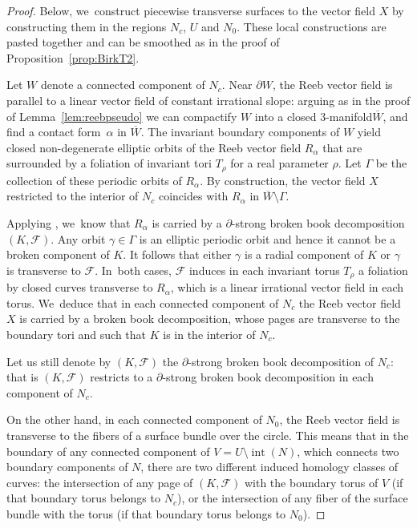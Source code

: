 \documentclass[11pt]{article}
\newcommand{\threemanifold}{$3$\nobreakdash-mani\-fold\xspace}
\theoremstyle{definition}
\begin{document}
\begin{proof}
Below, we~construct piecewise transverse surfaces to the vector field $X$ by constructing them in the regions $N_c$, $U$ and $N_0$. These local constructions are pasted together and can be smoothed as in the proof of Proposition~\ref{prop:BirkT2}.

Let $W$ denote a connected component of $N_c$. Near $\partial W$, the Reeb vector field is parallel to a linear vector field of constant irrational slope: arguing as in the proof of Lemma~\ref{lem:reebpseudo} we can compactify $W$ into a closed \threemanifold $\overline W$, and find a contact form~$\alpha$ in $\overline W$. The invariant boundary components of $W$ yield closed non-degenerate elliptic orbits of the Reeb vector field $R_\alpha$ that are surrounded by a foliation of invariant tori $T_\rho$ for a real parameter $\rho$. Let $\Gamma$ be the collection of these periodic orbits of $R_\alpha$.
By construction, the vector field $X$ restricted to the interior of $N_c$ coincides with $R_\alpha$ in $\overline W \setminus \Gamma$.

Applying \cite[Th.\,1.1]{CDR}, we~know that $R_\alpha$ is carried by a $\partial$-strong broken book decomposition $(K,\mathcal{F})$. Any orbit $\gamma \in \Gamma$ is an elliptic periodic orbit and hence it cannot be a broken component of $K$. It follows that either $\gamma$ is a radial component of $K$ or $\gamma$ is transverse to $\mathcal{F}$. In~both cases, $\mathcal{F}$ induces in each invariant torus $T_\rho$ a foliation by closed curves transverse to $R_\alpha$, which is a linear irrational vector field in each torus. We~deduce that in each connected component of $N_c$ the Reeb vector field $X$ is carried by a broken book decomposition, whose pages are transverse to the boundary tori and such that $K$ is in the interior of $N_c$.

Let us still denote by $(K,\mathcal{F})$ the $\partial$-strong broken book decomposition of $N_c$: that is $(K,\mathcal{F})$ restricts to a $\partial$-strong broken book decomposition in each component of $N_c$.

On the other hand, in each connected component of $N_0$, the Reeb vector field is transverse to the fibers of a surface bundle over the circle. This means that in the boundary of any connected component of $V={U\setminus \operatorname{int}(N)}$, which connects two boundary components of $N$, there are two different induced homology classes of curves: the intersection of any page of $(K,\mathcal{F})$ with the boundary torus of $V$ (if that boundary torus belongs to $N_c$), or the intersection of any fiber of the surface bundle with the torus (if that boundary torus belongs to $N_0$).\enlargethispage{.5\baselineskip}%


\end{proof}
\end{document}

